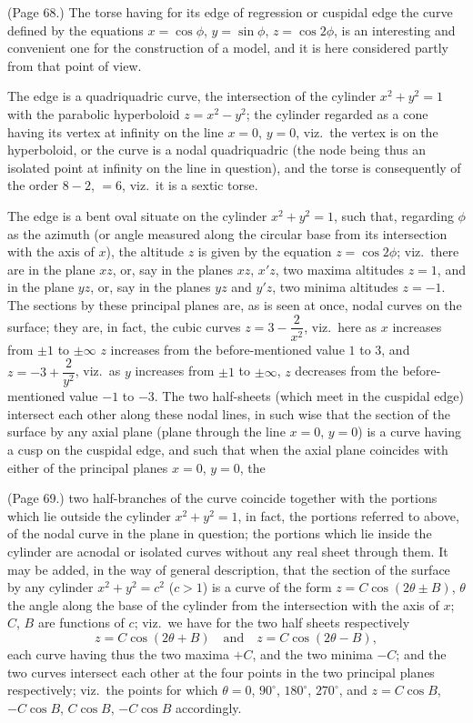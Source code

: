 \documentclass[11pt,a4paper]{article}
\begin{document}
\medskip

\noindent (Page 68.) The torse having for its edge of regression or cuspidal edge the curve defined by the equations $x = \cos\phi$, $y = \sin\phi$, $z = \cos 2\phi$, is an interesting and convenient one for the construction of a model, and it is here considered partly from that point of view.

The edge is a quadriquadric curve, the intersection of the cylinder $x^2 + y^2 = 1$ with the parabolic hyperboloid $z = x^2 - y^2$; the cylinder regarded as a cone having its vertex at infinity on the line $x = 0$, $y = 0$, viz.\ the vertex is on the hyperboloid, or the curve is a nodal quadriquadric (the node being thus an isolated point at infinity on the line in question), and the torse is consequently of the order $8 - 2$, $= 6$, viz.\ it is a sextic torse.

The edge is a bent oval situate on the cylinder $x^2 + y^2 = 1$, such that, regarding $\phi$ as the azimuth (or angle measured along the circular base from its intersection with the axis of $x$), the altitude $z$ is given by the equation $z = \cos 2\phi$; viz.\ there are in the plane $xz$, or, say in the planes $xz$, $x'z$, two maxima altitudes $z = 1$, and in the plane $yz$, or, say in the planes $yz$ and $y'z$, two minima altitudes $z = -1$. The sections by these principal planes are, as is seen at once, nodal curves on the surface; they are, in fact, the cubic curves $z = 3 - \dfrac{2}{x^2}$, viz.\ here as $x$ increases from $\pm 1$ to $\pm\infty$ $z$ increases from the before-mentioned value $1$ to $3$, and $z = -3 + \dfrac{2}{y^2}$, viz.\ as $y$ increases from $\pm 1$ to $\pm\infty$, $z$ decreases from the before-mentioned value $-1$ to $-3$. The two half-sheets (which meet in the cuspidal edge) intersect each other along these nodal lines, in such wise that the section of the surface by any axial plane (plane through the line $x = 0$, $y = 0$) is a curve having a cusp on the cuspidal edge, and such that when the axial plane coincides with either of the principal planes $x = 0$, $y = 0$, the

\bigskip

\noindent (Page 69.) two half-branches of the curve coincide together with the portions which lie outside the cylinder $x^2 + y^2 = 1$, in fact, the portions referred to above, of the nodal curve in the plane in question; the portions which lie inside the cylinder are acnodal or isolated curves without any real sheet through them. It may be added, in the way of general description, that the section of the surface by any cylinder $x^2 + y^2 = c^2$ ($c > 1$) is a curve of the form $z = C\cos(2\theta \pm B)$, $\theta$ the angle along the base of the cylinder from the intersection with the axis of $x$; $C$, $B$ are functions of $c$; viz.\ we have for the two half sheets respectively
\[
z = C\cos(2\theta + B)\quad \text{and}\quad z = C\cos(2\theta - B),
\]
each curve having thus the two maxima $+C$, and the two minima $-C$; and the two curves intersect each other at the four points in the two principal planes respectively; viz.\ the points for which $\theta = 0$, $90^\circ$, $180^\circ$, $270^\circ$, and $z = C\cos B$, $-C\cos B$, $C\cos B$, $-C\cos B$ accordingly.
\end{document}
